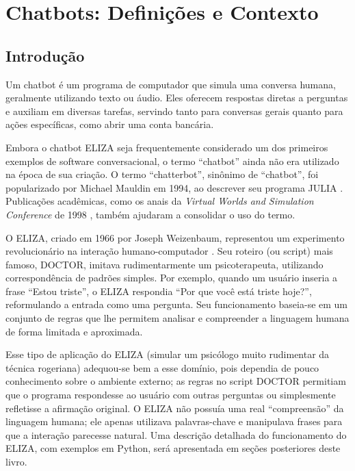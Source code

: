 \documentclass[14pt,a4paper,oneside]{book}
\begin{document}
\newpage

\tableofcontents
\newpage


\chapter{Chatbots: Definições e Contexto}

\section{Introdução}

Um chatbot é um programa de computador que simula uma conversa humana, geralmente utilizando texto ou áudio. Eles oferecem respostas diretas a perguntas e auxiliam em diversas tarefas, servindo tanto para conversas gerais quanto para ações específicas, como abrir uma conta bancária.

Embora o chatbot ELIZA \cite{Weizenbaum1996} seja frequentemente considerado um dos primeiros exemplos de software conversacional, o termo ``chatbot'' ainda não era utilizado na época de sua criação. 
O termo ``chatterbot'', sinônimo de ``chatbot'', foi popularizado por Michael Mauldin em 1994, ao descrever seu programa JULIA \cite{Mauldin1994}. 
Publicações acadêmicas, como os anais da \textit{Virtual Worlds and Simulation Conference} de 1998 \cite{Jacobstein1998}, também ajudaram a consolidar o uso do termo.

O ELIZA, criado em 1966 por Joseph Weizenbaum,  representou um experimento revolucionário na interação humano-computador \cite{Weizenbaum1996}. Seu roteiro (ou script)  mais famoso, DOCTOR, imitava rudimentarmente um psicoterapeuta, utilizando correspondência de padrões simples. Por exemplo, quando um usuário inseria a frase “Estou triste”, o ELIZA respondia “Por que você está triste hoje?”, reformulando a entrada como uma pergunta. Seu funcionamento baseia-se em um conjunto de regras que lhe permitem analisar e compreender a linguagem humana de forma limitada e aproximada. 

Esse tipo de aplicação do ELIZA (simular um psicólogo muito rudimentar da técnica rogeriana) adequou-se bem a esse domínio, pois dependia de pouco conhecimento sobre o ambiente externo; as regras no script DOCTOR permitiam que o programa respondesse ao usuário com outras perguntas ou simplesmente refletisse a afirmação original. O ELIZA não possuía uma real ``compreensão'' da linguagem humana; ele apenas utilizava palavras-chave e manipulava frases para que a interação parecesse natural. Uma descrição detalhada do funcionamento do ELIZA, com exemplos em Python, será apresentada em seções posteriores deste livro.
\end{document}

